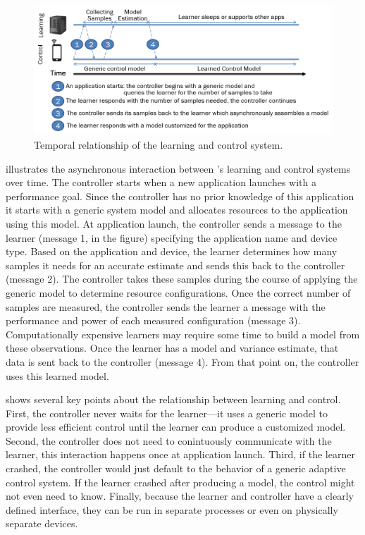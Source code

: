 \begin{figure}
  \includegraphics[width=\columnwidth]{figures/Timeline.png}
  \caption{Temporal relationship of the learning and control system.}
  \label{fig:timeline}
\end{figure}

 illustrates the asynchronous interaction between
\SYSTEM{}'s learning and control systems over time. The controller
starts when a new application launches with a performance goal.  Since
the controller has no prior knowledge of this application it starts
with a generic system model and allocates resources to the application
using this model.  At application launch, the controller sends a
message to the learner (message 1, in the figure) specifying the
application name and device type.  Based on the application and
device, the learner determines how many samples it needs for an
accurate estimate and sends this back to the controller (message 2).
The controller takes these samples during the course of applying the
generic model to determine resource configurations.  Once the correct
number of samples are measured, the controller sends the learner a
message with the performance and power of each measured configuration
(message 3).  Computationally expensive learners may require some time
to build a model from these observations.  Once the learner has a
model and variance estimate, that data is sent back to the controller
(message 4). From that point on, the controller uses this learned model.  

 shows several key points about the relationship
between learning and control.  First, the controller never waits for
the learner---it uses a generic model to provide less efficient
control until the learner can produce a customized model. Second, the
controller does not need to conintuously communicate with the learner,
this interaction happens once at application launch.  Third, if the
learner crashed, the controller would just default to the behavior of
a generic adaptive control system.  If the learner crashed after
producing a model, the control might not even need to know.  Finally,
because the learner and controller have a clearly defined interface,
they can be run in separate processes or even on physically separate
devices.

